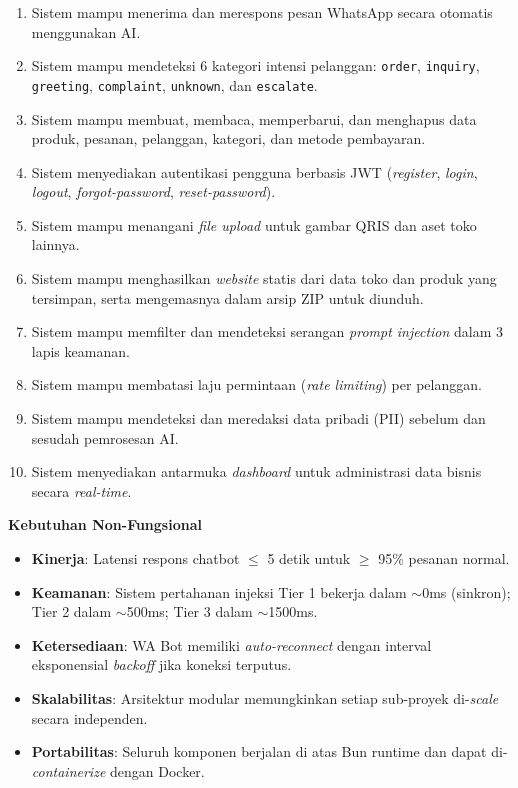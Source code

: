 \documentclass[12pt,a4paper,oneside]{article}
\begin{document}
\begin{enumerate}
	\item Sistem mampu menerima dan merespons pesan WhatsApp secara otomatis menggunakan AI.
	\item Sistem mampu mendeteksi 6 kategori intensi pelanggan: \texttt{order}, \texttt{inquiry}, \texttt{greeting}, \texttt{complaint}, \texttt{unknown}, dan \texttt{escalate}.
	\item Sistem mampu membuat, membaca, memperbarui, dan menghapus data produk, pesanan, pelanggan, kategori, dan metode pembayaran.
	\item Sistem menyediakan autentikasi pengguna berbasis JWT (\textit{register}, \textit{login}, \textit{logout}, \textit{forgot-password}, \textit{reset-password}).
	\item Sistem mampu menangani \textit{file upload} untuk gambar QRIS dan aset toko lainnya.
	\item Sistem mampu menghasilkan \textit{website} statis dari data toko dan produk yang tersimpan, serta mengemasnya dalam arsip ZIP untuk diunduh.
	\item Sistem mampu memfilter dan mendeteksi serangan \textit{prompt injection} dalam 3 lapis keamanan.
	\item Sistem mampu membatasi laju permintaan (\textit{rate limiting}) per pelanggan.
	\item Sistem mampu mendeteksi dan meredaksi data pribadi (PII) sebelum dan sesudah pemrosesan AI.
	\item Sistem menyediakan antarmuka \textit{dashboard} untuk administrasi data bisnis secara \textit{real-time}.
\end{enumerate}

\textbf{Kebutuhan Non-Fungsional}

\begin{itemize}
	\item \textbf{Kinerja}: Latensi respons chatbot $\le$ 5 detik untuk $\ge$ 95\% pesanan normal.
	\item \textbf{Keamanan}: Sistem pertahanan injeksi Tier 1 bekerja dalam $\sim$0ms (sinkron); Tier 2 dalam $\sim$500ms; Tier 3 dalam $\sim$1500ms.
	\item \textbf{Ketersediaan}: WA Bot memiliki \textit{auto-reconnect} dengan interval eksponensial \textit{backoff} jika koneksi terputus.
	\item \textbf{Skalabilitas}: Arsitektur modular memungkinkan setiap sub-proyek di-\textit{scale} secara independen.
	\item \textbf{Portabilitas}: Seluruh komponen berjalan di atas Bun runtime dan dapat di-\textit{containerize} dengan Docker.
\end{itemize}
\end{document}
